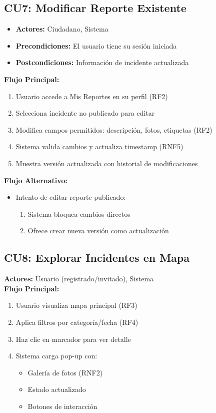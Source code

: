 \begin{multicols}{2}
\subsection*{CU7: Modificar Reporte Existente}
\begin{itemize}
    \item \textbf{Actores:} Ciudadano, Sistema
    \item \textbf{Precondiciones:} El usuario tiene su sesión iniciada
    \item \textbf{Postcondiciones:} Información de incidente actualizada 
\end{itemize}
\textbf{Flujo Principal:}
\begin{enumerate}
    \item Usuario accede a Mis Reportes en su perfil (RF2)
    \item Selecciona incidente no publicado para editar
    \item Modifica campos permitidos: descripción, fotos, etiquetas (RF2)
    \item Sistema valida cambios y actualiza timestamp (RNF5)
    \item Muestra versión actualizada con historial de modificaciones
\end{enumerate}

\textbf{Flujo Alternativo:}
\begin{itemize}
    \item Intento de editar reporte publicado:
    \begin{enumerate}
        \item Sistema bloquea cambios directos
        \item Ofrece crear nueva versión como actualización
    \end{enumerate}
\end{itemize}

\subsection*{CU8: Explorar Incidentes en Mapa}
\textbf{Actores:} Usuario (registrado/invitado), Sistema\\
\textbf{Flujo Principal:}
\begin{enumerate}
    \item Usuario visualiza mapa principal (RF3)
    \item Aplica filtros por categoría/fecha (RF4)
    \item Haz clic en marcador para ver detalle
    \item Sistema carga pop-up con:
    \begin{itemize}
        \item Galería de fotos (RNF2)
        \item Estado actualizado
        \item Botones de interacción
    \end{itemize}
\end{enumerate}


\end{multicols}
